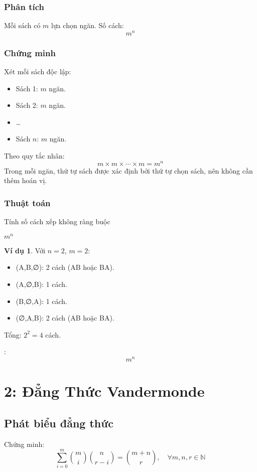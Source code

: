 \documentclass[a4paper,12pt]{article}
\theoremstyle{plain}
\theoremstyle{definition}
\newtheorem{example}{Ví dụ}
\begin{document}
\subsubsection*{Phân tích}
Mỗi sách có \( m \) lựa chọn ngăn. Số cách:
\[
m^n
\]

\subsubsection*{Chứng minh}
Xét mỗi sách độc lập:
\begin{itemize}
    \item Sách 1: \( m \) ngăn.
    \item Sách 2: \( m \) ngăn.
    \item \ldots
    \item Sách \( n \): \( m \) ngăn.
\end{itemize}
Theo quy tắc nhân:
\[
m \times m \times \cdots \times m = m^n
\]
Trong mỗi ngăn, thứ tự sách được xác định bởi thứ tự chọn sách, nên không cần thêm hoán vị.

\subsubsection*{Thuật toán}
\begin{algorithm}
\caption{Tính số cách xếp không ràng buộc}
\begin{algorithmic}
    \State \Return $m^n$
\EndFunction
\end{algorithmic}
\end{algorithm}

\begin{example}
Với \( n=2 \), \( m=2 \):
\begin{itemize}
    \item (A,B,∅): 2 cách (AB hoặc BA).
    \item (A,∅,B): 1 cách.
    \item (B,∅,A): 1 cách.
    \item (∅,A,B): 2 cách (AB hoặc BA).
\end{itemize}
Tổng: \( 2^2 = 4 \) cách.
\end{example}

:
\[
\boxed{m^n}
\]

\section*{2: Đẳng Thức Vandermonde}

\subsection*{Phát biểu đẳng thức}
Chứng minh:
\[
\sum_{i=0}^m \binom{m}{i}\binom{n}{r-i} = \binom{m+n}{r}, \quad \forall m,n,r \in \mathbb{N}
\]
\end{document}
